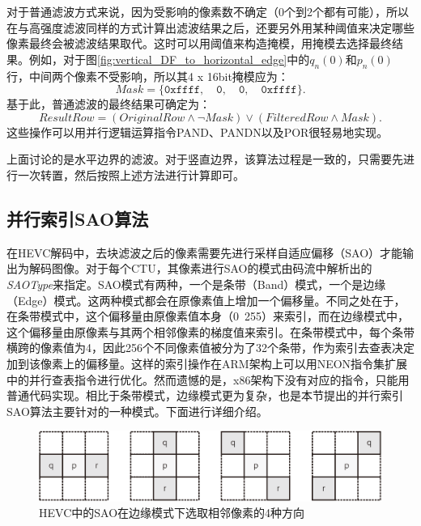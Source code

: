 对于普通滤波方式来说，因为受影响的像素数不确定（0个到2个都有可能），所以在与高强度滤波同样的方式计算出滤波结果之后，还要另外用某种阈值来决定哪些像素最终会被滤波结果取代。这时可以用阈值来构造掩模，用掩模去选择最终结果。例如，对于图\ref{fig:vertical_DF_to_horizontal_edge}中的$q_n(0)$和$p_n(0)$行，中间两个像素不受影响，所以其4 x 16bit掩模应为：
\begin{equation}
Mask = \{ \texttt{0xffff}, \quad \texttt{0}, \quad \texttt{0}, \quad \texttt{0xffff} \}.
\end{equation}
基于此，普通滤波的最终结果可确定为：
\begin{equation}
ResultRow = (OriginalRow \land \neg Mask ) \lor (FilteredRow \land Mask).
\end{equation}
这些操作可以用并行逻辑运算指令PAND、PANDN以及POR很轻易地实现。

上面讨论的是水平边界的滤波。对于竖直边界，该算法过程是一致的，只需要先进行一次转置，然后按照上述方法进行计算即可。

\subsection{并行索引SAO算法}

在HEVC解码中，去块滤波之后的像素需要先进行采样自适应偏移（SAO）才能输出为解码图像。对于每个CTU，其像素进行SAO的模式由码流中解析出的\textit{SAOType}来指定。SAO模式有两种，一个是条带（Band）模式，一个是边缘（Edge）模式。这两种模式都会在原像素值上增加一个偏移量。不同之处在于，在条带模式中，这个偏移量由原像素值本身（0~255）来索引，而在边缘模式中，这个偏移量由原像素与其两个相邻像素的梯度值来索引。在条带模式中，每个条带横跨的像素值为4，因此256个不同像素值被分为了32个条带，作为索引去查表决定加到该像素上的偏移量。这样的索引操作在ARM架构上可以用NEON指令集扩展中的并行查表指令进行优化。然而遗憾的是，x86架构下没有对应的指令，只能用普通代码实现。相比于条带模式，边缘模式更为复杂，也是本节提出的并行索引SAO算法主要针对的一种模式。下面进行详细介绍。

\begin{figure}[t]
	\centering
	\includegraphics[width = 0.9\linewidth]{eps/SAO_edge_direction}
	\caption{\label{fig:SAO_edge_direction}HEVC中的SAO在边缘模式下选取相邻像素的4种方向}
\end{figure}

